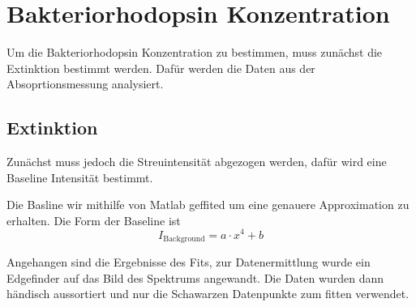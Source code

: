 \section*{Bakteriorhodopsin Konzentration}


Um die Bakteriorhodopsin Konzentration zu bestimmen, muss zunächst die Extinktion bestimmt werden. Dafür werden die Daten aus der Absoprtionsmessung analysiert.

\subsection*{Extinktion}
Zunächst muss jedoch die Streuintensität abgezogen werden, dafür wird eine Baseline Intensität bestimmt.


Die Basline wir mithilfe von Matlab geffited um eine genauere Approximation zu erhalten.
Die Form der Baseline ist 
\begin{equation*}
    I_{\mathrm{Background}} = a \cdot x^4 + b
\end{equation*}

Angehangen sind die Ergebnisse des Fits, zur Datenermittlung wurde ein Edgefinder auf das Bild des Spektrums angewandt.
Die Daten wurden dann händisch aussortiert und nur die Schawarzen Datenpunkte zum fitten verwendet.

